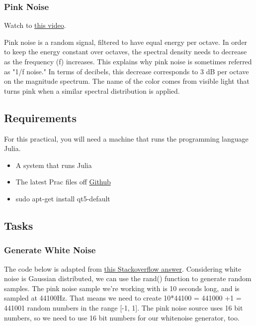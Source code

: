 \subsubsection{Pink Noise}
Watch to \href{https://www.youtube.com/watch?v=NO2xgLAfQac}{this video}.

Pink noise is a random signal, filtered to have equal energy per octave. In order to keep the energy constant over octaves, the spectral density needs to decrease as the frequency (f) increases. This explains why pink noise is sometimes referred as "1/f noise." In terms of decibels, this decrease corresponds to 3 dB per octave on the magnitude spectrum. The name of the color comes from visible light that turns pink when a similar spectral distribution is applied. \cite{pinknoise}

\subsection{Requirements}
For this practical, you will need a machine that runs the programming language Julia.
\begin{itemize}
    \item A system that runs Julia
    \item The latest Prac files off \href{https://github.com/kcranky/EEE4120F_Pracs}{Github}
    \item sudo apt-get install qt5-default
\end{itemize}

\subsection{Tasks}
\subsubsection{Generate White Noise}
The code below is adapted from \href{https://stackoverflow.com/a/53405121/1676144}{this Stackoverflow answer}.
Considering white noise is Gaussian distributed, we can use the rand() function to generate random samples. 
The pink noise sample we're working with is 10 seconds long, and is sampled at 44100Hz. That means we need to create 10*44100 = 441000 +1 = 441001 random numbers in the range [-1, 1]. The pink noise source uses 16 bit numbers, so we need to use 16 bit numbers for our whitenoise generator, too.

